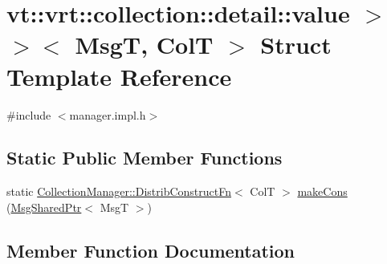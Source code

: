 \hypertarget{structvt_1_1vrt_1_1collection_1_1detail_1_1_insert_msg_dispatcher_3_01_msg_t_00_01_col_t_00_01st21bfbb9f37f35dd344d97132b3f17280}{}\section{vt\+:\+:vrt\+:\+:collection\+:\+:detail\+:\+:value $>$$>$$<$ MsgT, ColT $>$ Struct Template Reference}
\label{structvt_1_1vrt_1_1collection_1_1detail_1_1_insert_msg_dispatcher_3_01_msg_t_00_01_col_t_00_01st21bfbb9f37f35dd344d97132b3f17280}


{\ttfamily \#include $<$manager.\+impl.\+h$>$}

\subsection*{Static Public Member Functions}
\begin{DoxyCompactItemize}
\item 
static \hyperlink{structvt_1_1vrt_1_1collection_1_1_collection_manager_a9ef5ab71e344fdee8525c3f18241c305}{Collection\+Manager\+::\+Distrib\+Construct\+Fn}$<$ ColT $>$ \hyperlink{structvt_1_1vrt_1_1collection_1_1detail_1_1_insert_msg_dispatcher_3_01_msg_t_00_01_col_t_00_01st21bfbb9f37f35dd344d97132b3f17280_a56b771d6ce66b4fb63a3a588aaf7b34f}{make\+Cons} (\hyperlink{namespacevt_ab2b3d506ec8e8d1540aede826d84a239}{Msg\+Shared\+Ptr}$<$ MsgT $>$)
\end{DoxyCompactItemize}


\subsection{Member Function Documentation}
\mbox{\label{structvt_1_1vrt_1_1collection_1_1detail_1_1_insert_msg_dispatcher_3_01_msg_t_00_01_col_t_00_01st21bfbb9f37f35dd344d97132b3f17280_a56b771d6ce66b4fb63a3a588aaf7b34f}} 
